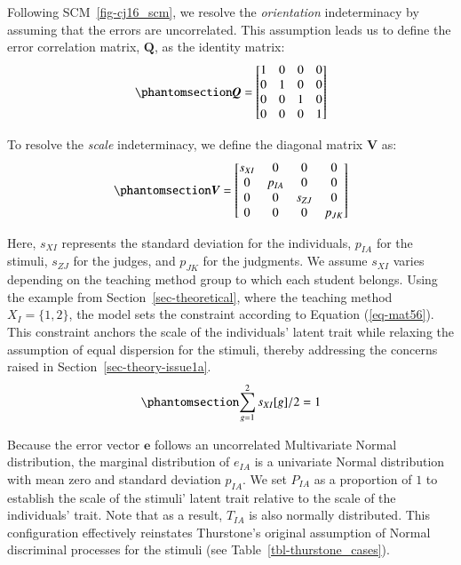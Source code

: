 \documentclass[
  authoryear,
  review,
  1p]{elsarticle}
\begin{document}
Following SCM~\ref{fig-cj16_scm}, we resolve the \emph{orientation}
indeterminacy by assuming that the errors are uncorrelated. This
assumption leads us to define the error correlation matrix,
\(\boldsymbol{Q}\), as the identity matrix:
\begin{equation}\phantomsection\label{eq-mat54}{
\boldsymbol{Q} = \begin{bmatrix}
    1 & 0 & 0 & 0 \\
    0 & 1 & 0 & 0 \\
    0 & 0 & 1 & 0 \\
    0 & 0 & 0 & 1 
  \end{bmatrix}
}\end{equation}

To resolve the \emph{scale} indeterminacy, we define the diagonal matrix
\(\boldsymbol{V}\) as: \begin{equation}\phantomsection\label{eq-mat55}{
\boldsymbol{V} = \begin{bmatrix}
    s_{XI} & 0 & 0 & 0 \\
    0 & p_{IA} & 0 & 0 \\
    0 & 0 & s_{ZJ} & 0 \\
    0 & 0 & 0 & p_{JK} 
  \end{bmatrix}
}\end{equation}

Here, \(s_{XI}\) represents the standard deviation for the individuals,
\(p_{IA}\) for the stimuli, \(s_{ZJ}\) for the judges, and \(p_{JK}\)
for the judgments. We assume \(s_{XI}\) varies depending on the teaching
method group to which each student belongs. Using the example from
Section~\ref{sec-theoretical}, where the teaching method
\(X_{I} = \{1,2\}\), the model sets the constraint according to Equation
(\ref{eq-mat56}). This constraint anchors the scale of the individuals'
latent trait while relaxing the assumption of equal dispersion for the
stimuli, thereby addressing the concerns raised in
Section~\ref{sec-theory-issue1a}.
\begin{equation}\phantomsection\label{eq-mat56}{
\sum_{g=1}^{2} s_{XI}[g]/2 = 1
}\end{equation}

Because the error vector \(\boldsymbol{e}\) follows an uncorrelated
Multivariate Normal distribution, the marginal distribution of
\(e_{IA}\) is a univariate Normal distribution with mean zero and
standard deviation \(p_{IA}\). We set \(P_{IA}\) as a proportion of
\(1\) to establish the scale of the stimuli' latent trait relative to
the scale of the individuals' trait. Note that as a result, \(T_{IA}\)
is also normally distributed. This configuration effectively reinstates
Thurstone's original assumption of Normal discriminal processes for the
stimuli (see Table~\ref{tbl-thurstone_cases}).
\end{document}
